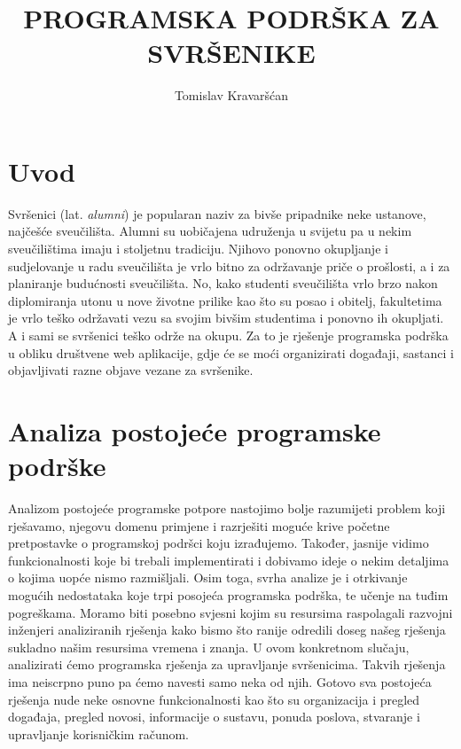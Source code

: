 \documentclass[times, utf8, zavrsni]{fer}
\begin{document}

\title{PROGRAMSKA PODRŠKA ZA SVRŠENIKE}

\author{Tomislav Kravaršćan}

\maketitle

\izvornik

\zahvala{}

\tableofcontents

\chapter{Uvod}
Svršenici (lat. \textit{alumni}) je popularan naziv za bivše pripadnike neke ustanove, najčešće sveučilišta. Alumni su uobičajena udruženja u svijetu pa u nekim sveučilištima imaju i stoljetnu tradiciju. Njihovo ponovno okupljanje i sudjelovanje u radu sveučilišta je vrlo bitno za održavanje priče o prošlosti, a i za planiranje budućnosti sveučilišta. No, kako studenti sveučilišta vrlo brzo nakon diplomiranja utonu u nove životne prilike kao što su posao i obitelj, fakultetima je vrlo teško održavati vezu sa svojim bivšim studentima i ponovno ih okupljati. A i sami se svršenici teško održe na okupu. Za to je rješenje programska podrška u obliku društvene web aplikacije, gdje će se moći organizirati događaji, sastanci i objavljivati razne objave vezane za svršenike.

\chapter{Analiza postojeće programske podrške}
Analizom postojeće programske potpore nastojimo bolje razumijeti problem koji rješavamo, njegovu domenu primjene i razrješiti moguće krive početne pretpostavke o programskoj podršci koju izrađujemo. Također, jasnije vidimo funkcionalnosti koje bi trebali implementirati i dobivamo ideje o nekim detaljima o kojima uopće nismo razmišljali. Osim toga, svrha analize je i otrkivanje mogućih nedostataka koje trpi posojeća programska podrška, te učenje na tuđim pogreškama. Moramo biti posebno svjesni kojim su resursima raspolagali razvojni inženjeri analiziranih rješenja kako bismo što ranije odredili doseg našeg rješenja sukladno našim resursima vremena i znanja.
U ovom konkretnom slučaju, analizirati ćemo programska rješenja za upravljanje svršenicima. Takvih rješenja ima neiscrpno puno pa ćemo navesti samo neka od njih. Gotovo sva postojeća rješenja nude neke osnovne funkcionalnosti kao što su organizacija i pregled događaja, pregled novosi, informacije o sustavu, ponuda poslova, stvaranje i upravljanje korisničkim računom.
\end{document}
